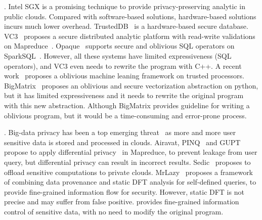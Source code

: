 . Intel SGX is a promising technique 
to provide privacy-preserving analytic in public clouds. Compared with 
software-based solutions, hardware-based solutions incurs much lower overhead. 
TrustedDB~\cite{trusteddb:sigmod11} is a hardware-based secure database.
VC3~\cite{vc3:sp15} proposes a secure distributed analytic platform
with read-write validations on Mapreduce~\cite{mapreduce}. 
Opaque~\cite{opaque:nsdi17} supports secure and oblivious SQL operators on 
SparkSQL~\cite{sparksql:sigmod15}. However, all these systems have limited 
expressiveness (\eg SQL operators), and VC3 even needs to rewrite the program 
with C++. A recent work~\cite{oblivious:security16} proposes a oblivious 
machine leaning framework on trusted processors. 
BigMatrix~\cite{bigmatrix:ccs17} proposes an oblivious and secure vectorization
abstraction on python, but it has limited expressiveness and it needs to
rewrite the original program with this new abstraction. Although BigMatrix 
provides guideline for writing a oblivious program, but it would be a 
time-consuming and error-prone process.


. Big-data privacy has been a top 
emerging threat~\cite{top-threats-nine, kazim2015survey} as more and more user 
sensitive data is stored and processed in clouds. 
Airavat\cite{airavat:nsdi10}, PINQ~\cite{pinq:sigmod09} and 
GUPT~\cite{gupt:sigmod12} propose to apply differential 
privacy~\cite{noise:tcc06,differential:focs07} in Mapreduce,
to prevent leakage from user query, but differential privacy can result in 
incorrect results. Sedic~\cite{sedic:cloud13} proposes to offload sensitive 
computations to private clouds. MrLazy~\cite{hotcloud14:mrlazy}
proposes a framework of combining data provenance and static DFT analysis for 
self-defined queries, to provide fine-grained information flow for security. 
However, static DFT is not precise and may suffer from false positive. \kakute 
provides fine-grained information control of sensitive data, with no need to 
modify the original program.

